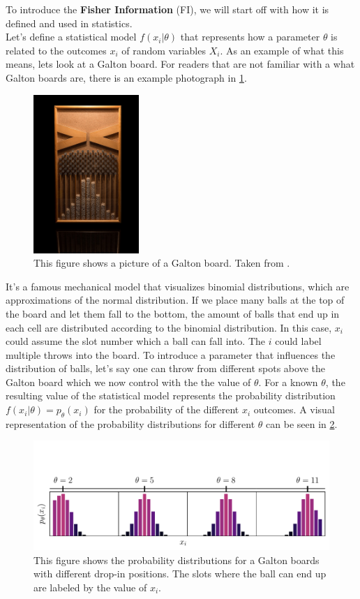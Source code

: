 To introduce the \textbf{Fisher Information} (FI), we will start off with how it is defined and used in statistics.\\
Let's define a statistical model $f(x_i|\theta)$ that represents how a parameter $\theta$ is related to the outcomes $x_i$ of random variables $X_i$\cite{StatisticFisherInfoTutorial}. As an example of what this means, lets look at a Galton board. For readers that are not familiar with a what Galton boards are, there is an example photograph in \cref{fig:GaltonPicture}. 
\begin{figure}
	\centering
	\includegraphics[width = 4cm]{text/FisherInformation/plots/GaltonBoard.jpg}
	\caption{This figure shows a picture of a Galton board. Taken from \cite{GaltonBoardPicture}.}
	\label{fig:GaltonPicture}
\end{figure}
It's a famous mechanical model that visualizes binomial distributions, which are approximations of the normal distribution. If we place many balls at the top of the board and let them fall to the bottom, the amount of balls that end up in each cell are distributed according to the binomial distribution. In this case, $x_i$ could assume the slot number which a ball can fall into. The $i$ could label multiple throws into the board. To introduce a parameter that influences the distribution of balls, let's say one can throw from different spots above the Galton board which we now control with the the value of $\theta$. For a known $\theta$, the resulting value of the statistical model represents the probability distribution $f(x_i|\theta) = p_\theta(x_i)$ for the probability of the different $x_i$ outcomes. A visual representation of the probability distributions for different $\theta$ can be seen in \cref{fig:GaltonDistributions}.
\begin{figure}
	\centering
	\includegraphics[width = \textwidth, clip, trim= 0cm 0cm 0cm 2.3cm]{text/FisherInformation/plots/GaltonDistributionsPlot.pdf}
	\caption{This figure shows the probability distributions for a Galton boards with different drop-in positions. The slots where the ball can end up are labeled by the value of $x_i$.}
	\label{fig:GaltonDistributions}
\end{figure}\\
